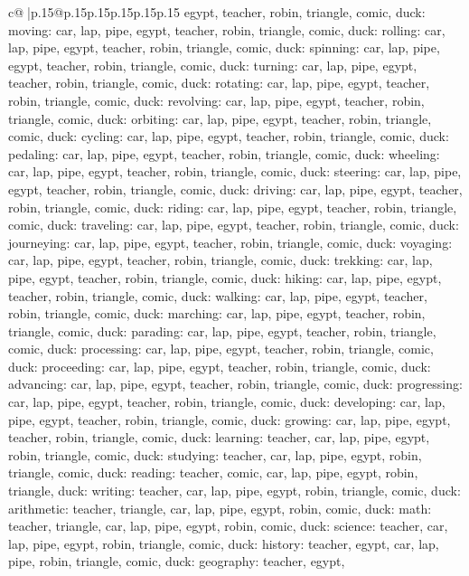 \documentclass{article}
\begin{document}
{\begin{supertabular}{c@{$\;$}|p{.15\linewidth}@{}p{.15\linewidth}p{.15\linewidth}p{.15\linewidth}p{.15\linewidth}p{.15\linewidth}}
{{{egypt, teacher, robin, triangle, comic, duck\n\nCLUE: moving\nTARGETS: car, lap, pipe, egypt, teacher, robin, triangle, comic, duck\n\nCLUE: rolling\nTARGETS: car, lap, pipe, egypt, teacher, robin, triangle, comic, duck\n\nCLUE: spinning\nTARGETS: car, lap, pipe, egypt, teacher, robin, triangle, comic, duck\n\nCLUE: turning\nTARGETS: car, lap, pipe, egypt, teacher, robin, triangle, comic, duck\n\nCLUE: rotating\nTARGETS: car, lap, pipe, egypt, teacher, robin, triangle, comic, duck\n\nCLUE: revolving\nTARGETS: car, lap, pipe, egypt, teacher, robin, triangle, comic, duck\n\nCLUE: orbiting\nTARGETS: car, lap, pipe, egypt, teacher, robin, triangle, comic, duck\n\nCLUE: cycling\nTARGETS: car, lap, pipe, egypt, teacher, robin, triangle, comic, duck\n\nCLUE: pedaling\nTARGETS: car, lap, pipe, egypt, teacher, robin, triangle, comic, duck\n\nCLUE: wheeling\nTARGETS: car, lap, pipe, egypt, teacher, robin, triangle, comic, duck\n\nCLUE: steering\nTARGETS: car, lap, pipe, egypt, teacher, robin, triangle, comic, duck\n\nCLUE: driving\nTARGETS: car, lap, pipe, egypt, teacher, robin, triangle, comic, duck\n\nCLUE: riding\nTARGETS: car, lap, pipe, egypt, teacher, robin, triangle, comic, duck\n\nCLUE: traveling\nTARGETS: car, lap, pipe, egypt, teacher, robin, triangle, comic, duck\n\nCLUE: journeying\nTARGETS: car, lap, pipe, egypt, teacher, robin, triangle, comic, duck\n\nCLUE: voyaging\nTARGETS: car, lap, pipe, egypt, teacher, robin, triangle, comic, duck\n\nCLUE: trekking\nTARGETS: car, lap, pipe, egypt, teacher, robin, triangle, comic, duck\n\nCLUE: hiking\nTARGETS: car, lap, pipe, egypt, teacher, robin, triangle, comic, duck\n\nCLUE: walking\nTARGETS: car, lap, pipe, egypt, teacher, robin, triangle, comic, duck\n\nCLUE: marching\nTARGETS: car, lap, pipe, egypt, teacher, robin, triangle, comic, duck\n\nCLUE: parading\nTARGETS: car, lap, pipe, egypt, teacher, robin, triangle, comic, duck\n\nCLUE: processing\nTARGETS: car, lap, pipe, egypt, teacher, robin, triangle, comic, duck\n\nCLUE: proceeding\nTARGETS: car, lap, pipe, egypt, teacher, robin, triangle, comic, duck\n\nCLUE: advancing\nTARGETS: car, lap, pipe, egypt, teacher, robin, triangle, comic, duck\n\nCLUE: progressing\nTARGETS: car, lap, pipe, egypt, teacher, robin, triangle, comic, duck\n\nCLUE: developing\nTARGETS: car, lap, pipe, egypt, teacher, robin, triangle, comic, duck\n\nCLUE: growing\nTARGETS: car, lap, pipe, egypt, teacher, robin, triangle, comic, duck\n\nCLUE: learning\nTARGETS: teacher, car, lap, pipe, egypt, robin, triangle, comic, duck\n\nCLUE: studying\nTARGETS: teacher, car, lap, pipe, egypt, robin, triangle, comic, duck\n\nCLUE: reading\nTARGETS: teacher, comic, car, lap, pipe, egypt, robin, triangle, duck\n\nCLUE: writing\nTARGETS: teacher, car, lap, pipe, egypt, robin, triangle, comic, duck\n\nCLUE: arithmetic\nTARGETS: teacher, triangle, car, lap, pipe, egypt, robin, comic, duck\n\nCLUE: math\nTARGETS: teacher, triangle, car, lap, pipe, egypt, robin, comic, duck\n\nCLUE: science\nTARGETS: teacher, car, lap, pipe, egypt, robin, triangle, comic, duck\n\nCLUE: history\nTARGETS: teacher, egypt, car, lap, pipe, robin, triangle, comic, duck\n\nCLUE: geography\nTARGETS: teacher, egypt, }}}
\end{supertabular}}
\end{document}
